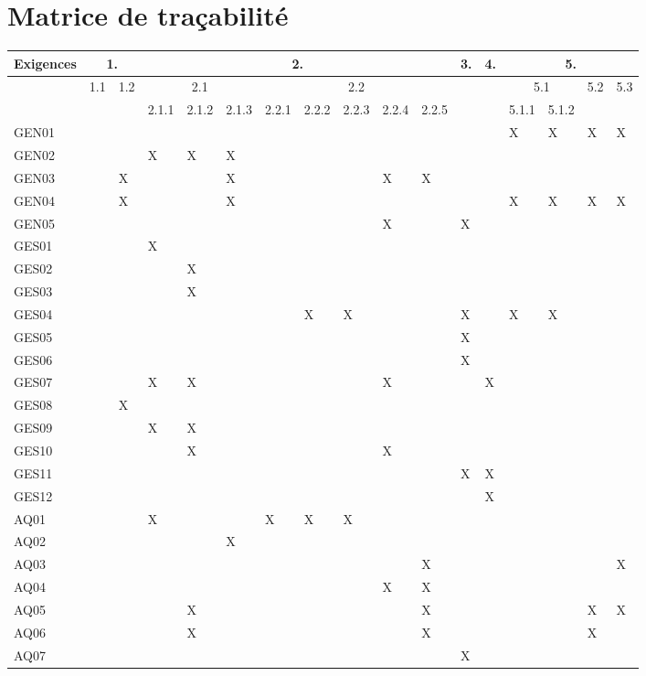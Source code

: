 \chapter{Matrice de traçabilité}
\begin{table}[H]
\hspace{-30px}
\begin{tabular}{|p{}|p{0.67cm}|p{0.67cm}|p{0.67cm}|p{0.67cm}|p{0.67cm}|p{0.67cm}|p{0.67cm}|p{0.67cm}|p{0.67cm}|p{0.67cm}|p{0.67cm}|p{0.67cm}|p{0.67cm}|p{0.67cm}|p{0.67cm}|p{0.67cm}|}
\hline
	Exigences & \multicolumn{2}{c|}{1.} & \multicolumn{8}{c|}{2.} & 3. & 4. & \multicolumn{4}{c|}{5.} \\ 
\hline
	& 1.1 & 1.2 & \multicolumn{3}{c|}{2.1} & \multicolumn{5}{c|}{2.2} & & & \multicolumn{2}{c|}{5.1} & 5.2 & 5.3 \\
\hline
	& & & 2.1.1 & 2.1.2 & 2.1.3 & 2.2.1 & 2.2.2 & 2.2.3 & 2.2.4 & 2.2.5 & & & 5.1.1 & 5.1.2 & & \\
\hline  
	GEN01 & & & & & & & & & & & & & X & X & X & X \\
\hline  
	GEN02\footnotemark {} & & & X & X & X & & & & & & & & & & & \\
\hline  
	GEN03 & & X & & & X & & & & X & X & & & & & & \\
\hline  
	GEN04 & & X & & & X & & & & & & & & X & X & X & X \\
\hline  
	GEN05 & & & & & & & & & X & & X & & & & & \\
\hline  
	GES01 & & & X & & & & & & & & & & & & & \\
\hline  
	GES02 & & & & X & & & & & & & & & & & & \\
\hline  
	GES03 & & & & X & & & & & & & & & & & & \\
\hline  
	GES04 & & & & & & & X & X & & & X & & X & X & & \\
\hline  
	GES05 & & & & & & & & & & & X & & & & & \\
\hline  
	GES06 & & & & & & & & & & & X & & & & & \\
\hline  
	GES07 & & & X & X & & & & & X & & & X & & & & \\
\hline  
	GES08 & & X & & & & & & & & & & & & & & \\
\hline  
	GES09 & & & X & X & & & & & & & & & & & & \\
\hline  
	GES10 & & & & X & & & & & X & & & & & & & \\
\hline  
	GES11 & & & & & & & & & & & X & X & & & & \\
\hline  
	GES12 & & & & & & & & & & & & X & & & & \\
\hline  
	AQ01 & & & X & & & X & X & X & & & & & & & & \\
\hline  
	AQ02 & & & & & X & & & & & & & & & & & \\
\hline  
	AQ03 & & & & & & & & & & X & & & & & & X\\	
\hline  
	AQ04 & & & & & & & & & X & X & & & & & & \\	
\hline  
	AQ05 & & & & X & & & & & & X & & & & & X & X\\	
\hline  
	AQ06 & & & & X & & & & & & X & & & & & X & \\	
\hline  
	AQ07 & & & & & & & & & & & X & & & & & \\								


\end{tabular}
\end{table}
